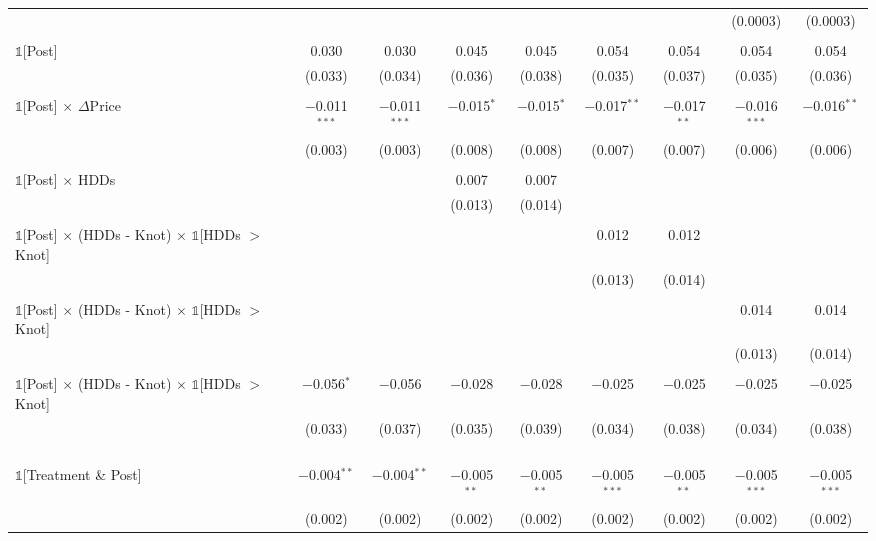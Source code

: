 \begin{table}[!htbp]
\begin{longtable}{@{\extracolsep{0pt}}lcccccccc}
  &  &  &  &  &  &  & (0.0003) & (0.0003) \\ 
  & & & & & & & & \\ 
 $\mathbb{1}$[Post] & 0.030 & 0.030 & 0.045 & 0.045 & 0.054 & 0.054 & 0.054 & 0.054 \\ 
  & (0.033) & (0.034) & (0.036) & (0.038) & (0.035) & (0.037) & (0.035) & (0.036) \\ 
  & & & & & & & & \\ 
 $\mathbb{1}$[Post] $\times$ $\Delta$Price & $-$0.011$^{***}$ & $-$0.011$^{***}$ & $-$0.015$^{*}$ & $-$0.015$^{*}$ & $-$0.017$^{**}$ & $-$0.017$^{**}$ & $-$0.016$^{***}$ & $-$0.016$^{**}$ \\ 
  & (0.003) & (0.003) & (0.008) & (0.008) & (0.007) & (0.007) & (0.006) & (0.006) \\ 
  & & & & & & & & \\ 
 $\mathbb{1}$[Post] $\times$ HDDs &  &  & 0.007 & 0.007 &  &  &  &  \\ 
  &  &  & (0.013) & (0.014) &  &  &  &  \\ 
  & & & & & & & & \\ 
 $\mathbb{1}$[Post] $\times$ (HDDs - Knot) $\times$ $\mathbb{1}$[HDDs $>$ Knot] &  &  &  &  & 0.012 & 0.012 &  &  \\ 
  &  &  &  &  & (0.013) & (0.014) &  &  \\ 
  & & & & & & & & \\ 
 $\mathbb{1}$[Post] $\times$ (HDDs - Knot) $\times$ $\mathbb{1}$[HDDs $>$ Knot] &  &  &  &  &  &  & 0.014 & 0.014 \\ 
  &  &  &  &  &  &  & (0.013) & (0.014) \\ 
  & & & & & & & & \\ 
 $\mathbb{1}$[Post] $\times$ (HDDs - Knot) $\times$ $\mathbb{1}$[HDDs $>$ Knot] & $-$0.056$^{*}$ & $-$0.056 & $-$0.028 & $-$0.028 & $-$0.025 & $-$0.025 & $-$0.025 & $-$0.025 \\ 
  & (0.033) & (0.037) & (0.035) & (0.039) & (0.034) & (0.038) & (0.034) & (0.038) \\ 
  & & & & & & & & \\
  & & & & & & & & \\
  & & & & & & & & \\
  & & & & & & & & \\
 $\mathbb{1}$[Treatment \& Post] & $-$0.004$^{**}$ & $-$0.004$^{**}$ & $-$0.005$^{**}$ & $-$0.005$^{**}$ & $-$0.005$^{***}$ & $-$0.005$^{**}$ & $-$0.005$^{***}$ & $-$0.005$^{***}$ \\ 
  & (0.002) & (0.002) & (0.002) & (0.002) & (0.002) & (0.002) & (0.002) & (0.002) \\ 

\end{longtable}
\end{table}
